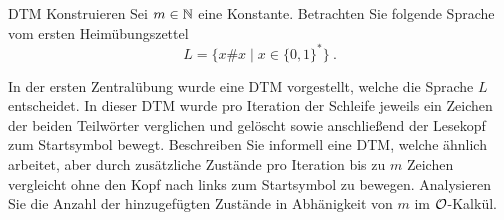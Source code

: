 \documentclass[answers]{submit}
\begin{document}
\exerciseheader
\exercisetitle
\begin{exercise}[6]{DTM Konstruieren}
  Sei $m\in\mathbb{N}$ eine Konstante.
  Betrachten Sie folgende Sprache vom ersten Heimübungszettel
  \[ L = \{ x\# x \mid x\in\{0,1\}^* \} \ . \]

  In der ersten Zentralübung wurde eine DTM vorgestellt, welche die Sprache $L$ entscheidet.
  In dieser DTM wurde pro Iteration der Schleife jeweils ein Zeichen der beiden Teilwörter verglichen und gelöscht sowie anschließend der Lesekopf zum Startsymbol bewegt.
  Beschreiben Sie informell eine DTM, welche ähnlich arbeitet, aber durch zusätzliche Zustände pro Iteration bis zu $m$ Zeichen vergleicht ohne den Kopf nach links zum Startsymbol zu bewegen.
  Analysieren Sie die Anzahl der hinzugefügten Zustände in Abhänigkeit von $m$ im $\mathcal{O}$-Kalkül.

\end{exercise}
\end{document}
